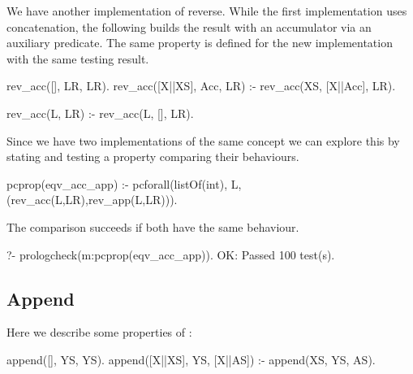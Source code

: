 We have another implementation of reverse.
While the first implementation uses concatenation, the following
builds the result with an accumulator via an auxiliary predicate.
%
%
The same property is defined for the new implementation with the same
testing result.
\begin{yapcode}
 rev_acc([], LR, LR).
 rev_acc([X||XS], Acc, LR) :- rev_acc(XS, [X||Acc], LR).

 rev_acc(L, LR) :- rev_acc(L, [], LR).
\end{yapcode}


Since we have two implementations of the same concept we can explore
this by 
stating and testing a property comparing their behaviours.
%
\begin{yapcode}
 pcprop(eqv_acc_app) :-
   pcforall(listOf(int), L, (rev_acc(L,LR),rev_app(L,LR))).
\end{yapcode}
The comparison succeeds if both have the same behaviour.
%
\begin{yapcode}
   ?- prologcheck(m:pcprop(eqv_acc_app)).
 OK: Passed 100 test(s).
\end{yapcode}



\subsection{Append}
Here we describe some properties of  :
%
\begin{yapcode}
 append([], YS, YS).
 append([X||XS], YS, [X||AS]) :- append(XS, YS, AS).
\end{yapcode}


